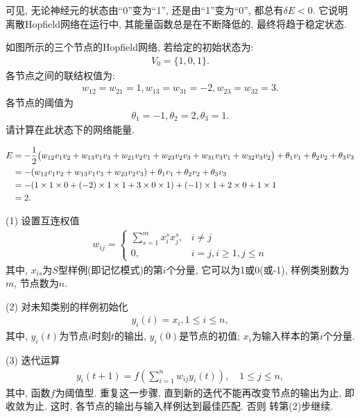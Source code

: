 可见, 无论神经元的状态由“0”变为“1”, 还是由“1”变为“0”, 都总有$\delta E<0$. 它说明离散Hopfield网络在运行中, 其能量函数总是在不断降低的, 最终将趋于稳定状态.
\begin{example}
如图所示的三个节点的Hopfield网络, 若给定的初始状态为:
\begin{align*}
    V_0=\{1,0,1\}.
\end{align*}
各节点之间的联结权值为:
\begin{align*}
     w_{12}=w_{21}=1, w_{13}=w_{31}=-2, w_{23}=w_{32}=3.
\end{align*}
各节点的阈值为
\begin{align*}
    \theta_1=-1, \theta_2=2, \theta_3=1.
\end{align*}
请计算在此状态下的网络能量.
\end{example}
\begin{result}
\begin{align}
E&=-\frac 1 2 \big(w_{12}v_1v_2+w_{13}v_1v_3+w_{21}v_2 v_1+w_{23}v_2v_3+w_{31}v_3v_1+w_{32}v_3 v_2\big)+ \theta_1 v_1+ \theta_2v_2+ \theta_3v_3\notag\\
    &= -(w_{12}v_1v_2+w_{13}v_1v_3+w_{23}v_2v_3)+ \theta_1v_1+\theta_2v_2+\theta_3v_3\notag\\
    &=-(1\times 1\times 0+(-2)\times 1\times 1+3\times 0\times 1)+(-1) \times 1+2\times 0+1\times 1\notag\\
    &=2.
\end{align}

(1) 设置互连权值
\begin{align}
    w_{i j}=\left\{\begin{array}{ll}{\sum_{s=1}^{m} x_{i}^{s} x_{j}^{s},} & {i \neq j} \\ {0,} & {i=j, i \geq 1, j \leq n}\end{array}\right.
\end{align}
其中, $x_{is}$为$S$型样例(即记忆模式)的第$i$个分量, 它可以为1或0(或-1), 样例类别数为$m$, 节点数为$n$.

(2) 对未知类别的样例初始化
\begin{align}
    y_{i}(i)=x_{i}, 1 \leq i \leq n,
\end{align}
其中, $y_i(t)$为节点$i$时刻$t$的输出, $y_i(0)$是节点的初值; $x_i$为输入样本的第$i$个分量.

(3) 迭代运算
\begin{align}
    y_{i}(t+1)=f\left(\sum_{i=1}^{n} w_{i j} y_{i}(t)\right), \quad 1 \leq j \leq n,
\end{align}
其中, 函数$f$为阈值型. 重复这一步骤, 直到新的迭代不能再改变节点的输出为止, 即收敛为止. 这时, 各节点的输出与输入样例达到最佳匹配. 否则 转第(2)步继续.
\end{result}
